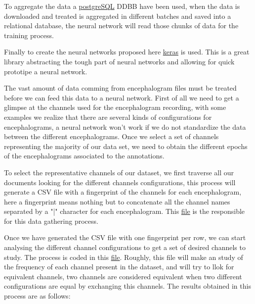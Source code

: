 To aggregate the data a \href{https://www.postgresql.org/}{postgreSQL} DDBB have been used, when the data is downloaded and treated is aggregated in different batches and saved into a relational database, the neural network will read those chunks of data for the training process.

Finally to create the neural networks proposed here \href{https://keras.io/}{keras} is used. This is a great library abstracting the tough part of neural networks and allowing for quick prototipe a neural network. 

The vast amount of data comming from encephalogram files must be treated before we can feed this data to a neural network.
First of all we need to get a glimpse at the channels used for the encephalogram recording, with some examples we realize that there are several kinds of configurations for encephalograms, a neural network won't work if we do not standardize the data between the different encephalograms. Once we select a set of channels representing the majority of our data set, we need to obtain the different epochs of the encephalograms associated to the annotations. 

To select the representative channels of our dataset, we first traverse all our documents looking for the different channels configurations, this process will generate a CSV file with a fingerprint of the channels for each encephalogram, here a fingerprint means nothing but to concatenate all the channel names separated by a "|" character for each encephalogram. This \href{https://github.com/szz-dvl/soundless/blob/main/parser_channels.py}{file} is the responsible for this data gathering process.

Once we have generated the CSV file with one fingerprint per row, we can start analysing the different channel configurations to get a set of desired channels to study. The process is coded in this \href{https://github.com/szz-dvl/soundless/blob/main/channels.py}{file}. Roughly, this file will make an study of the frequency of each channel present in the dataset, and will try to llok for equivalent channels, two channels are considered equivalent when two different configurations are equal by exchanging this channels. The results obtained in this process are as follows:

